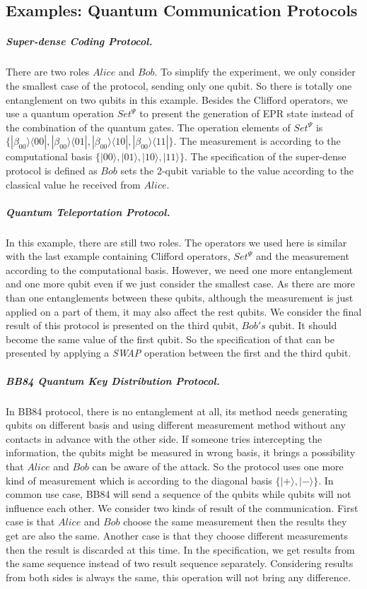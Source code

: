 \documentclass[a4paper,UKenglish,cleveref, autoref]{lipics-v2019}
\begin{document}
\subsection{Examples: Quantum Communication Protocols}
\subparagraph*{Super-dense Coding Protocol.} There are two roles $Alice$ and $Bob$. To simplify the experiment, we only consider the smallest case of the protocol, sending only one qubit. So there is totally one entanglement on two qubits in this example. Besides the Clifford operators, we use a quantum operation $Set^{\Psi}$ to present the generation of EPR state instead of the combination of the quantum gates. The operation elements of $Set^{\Psi}$ is $\{|\beta_{00}\rangle\langle00|,|\beta_{00}\rangle\langle01|,|\beta_{00}\rangle\langle10|,|\beta_{00}\rangle\langle11|\}$. The measurement is according to the computational basis $\{|00\rangle,|01\rangle,|10\rangle,|11\rangle\}$. The specification of the super-dense protocol is defined as $Bob$ sets the 2-qubit variable to the value according to the classical value he received from $Alice$.
\subparagraph*{Quantum Teleportation Protocol.} In this example, there are still two roles. The operators we used here is similar with the last example containing Clifford operators, $Set^{\Psi}$ and the measurement according to the computational basis. However, we need one more entanglement and one more qubit even if we just consider the smallest case. As there are more than one entanglements between these qubits, although the measurement is just applied on a part of them, it may also affect the rest qubits. We consider the final result of this protocol is presented on the third qubit, $Bob's$ qubit. It should become the same value of the first qubit. So the specification of that can be presented by applying a \textit{SWAP} operation between the first and the third qubit.
\subparagraph*{BB84 Quantum Key Distribution Protocol.} In BB84 protocol, there is no entanglement at all, its method needs generating qubits on different basis and using different measurement method without any contacts in advance with the other side. If someone tries intercepting the information, the qubits might be measured in wrong basis, it brings a possibility that $Alice$ and $Bob$ can be aware of the attack. So the protocol uses one more kind of measurement which is according to the diagonal basis $\{|+\rangle,|-\rangle\}$. In common use case, BB84 will send a sequence of the qubits while qubits will not influence each other. We consider two kinds of result of the communication. First case is that $Alice$ and $Bob$ choose the same measurement then the results they get are also the same. Another case is that they choose different measurements then the result is discarded at this time. In the specification, we get results from the same sequence instead of two result sequence separately. Considering results from both sides is always the same, this operation will not bring any difference.
\end{document}
